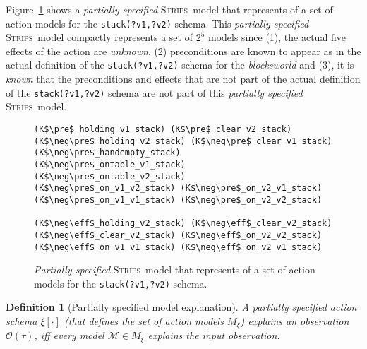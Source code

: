 \documentclass{article}
\newcommand{\pre}{\mathsf{pre}}     %
\newcommand{\eff}{\mathsf{eff}}     %
\newcommand{\strips}{\textsc{Strips}}
\newtheorem{definition}[theorem]{Definition}
\begin{document}
Figure~\ref{fig:partial} shows a {\em partially specified} \strips\ model that represents of a set of action models for the {\tt\small stack(?v1,?v2)} schema. This {\em partially specified} \strips\ model compactly represents a set of $2^5$ models since (1), the actual five effects of the action are {\em unknown}, (2) preconditions are known to appear as in the actual definition of the {\tt\small stack(?v1,?v2)} schema for the {\em blocksworld} and (3), it is {\em known} that the preconditions and effects that are not part of the actual definition of the {\tt\small stack(?v1,?v2)} schema are not part of this {\em partially specified} \strips\ model.

\begin{figure}
  \begin{tiny}  
 \begin{lstlisting}
(K$\pre$_holding_v1_stack) (K$\pre$_clear_v2_stack)
(K$\neg\pre$_holding_v2_stack) (K$\neg\pre$_clear_v1_stack)
(K$\neg\pre$_handempty_stack) 
(K$\neg\pre$_ontable_v1_stack) (K$\neg\pre$_ontable_v2_stack)
(K$\neg\pre$_on_v1_v2_stack) (K$\neg\pre$_on_v2_v1_stack)
(K$\neg\pre$_on_v1_v1_stack) (K$\neg\pre$_on_v2_v2_stack) 

(K$\neg\eff$_holding_v2_stack) (K$\neg\eff$_clear_v2_stack)
(K$\neg\eff$_clear_v2_stack) (K$\neg\eff$_on_v2_v2_stack)
(K$\neg\eff$_on_v1_v1_stack) (K$\neg\eff$_on_v2_v1_stack)
  \end{lstlisting}           
  \end{tiny}  
 \caption{\small {\em Partially specified} \strips\ model that represents of a set of action models for the {\tt\small stack(?v1,?v2)} schema.}
\label{fig:partial}
\end{figure}

\begin{definition}[Partially specified model explanation]
A partially specified action schema $\xi[\cdot]$ (that defines the set of action models $M_\xi$) {\em explains} an observation $\mathcal{O}(\tau)$, iff every model $\mathcal{M}\in M_{\xi}$ {\em explains} the input observation.
\end{definition}
\end{document}
